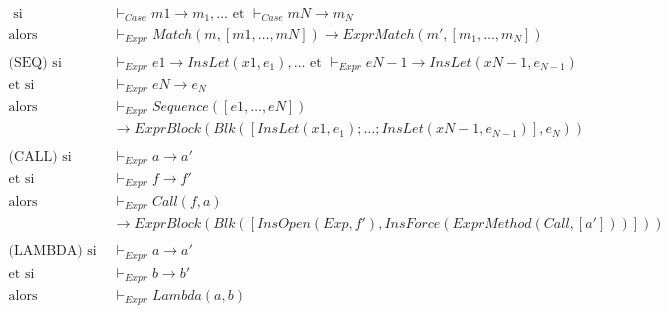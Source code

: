 \documentclass[
  12pt,
]{article}
\begin{document}
\begin{align*}
  \text{ si }                  & \vdash_{Case} m1 \rightarrow  m_1, \dots \text{ et } \vdash_{Case} mN \rightarrow  m_N                                  \\
  \text{alors}                 & \vdash_{Expr} Match(m,[m1,\dots,mN]) \rightarrow  ExprMatch(m', [m_1,\dots,m_N])                                        \\
  \\
  \text{(SEQ)} \text{ si }     & \vdash_{Expr} e1 \rightarrow  InsLet(x1, e_1), \dots \text{ et }  \vdash_{Expr} eN-1 \rightarrow  InsLet(xN-1, e_{N-1}) \\
  \text{et si }                & \vdash_{Expr} eN \rightarrow  e_N                                                                                       \\
  \text{alors}                 & \vdash_{Expr} Sequence([e1,\dots,eN])                                                                                   \\
                               & \rightarrow  ExprBlock(Blk([InsLet(x1, e_1); \dots ; InsLet(xN-1, e_{N-1})], e_N))                                      \\
  \\
  \text{(CALL)} \text{ si }    & \vdash_{Expr} a \rightarrow  a'                                                                                         \\
  \text{et si }                & \vdash_{Expr} f \rightarrow  f'                                                                                         \\
  \text{alors}                 & \vdash_{Expr} Call(f, a)                                                                                                \\
                               & \rightarrow  ExprBlock(Blk([InsOpen(Exp, f'), InsForce(ExprMethod(Call, [a']))]))                                       \\
  \\
  \text{(LAMBDA)} \text{ si }  & \vdash_{Expr} a \rightarrow  a'                                                                                         \\
  \text{et si }                & \vdash_{Expr} b \rightarrow  b'                                                                                         \\
  \text{alors}                 & \vdash_{Expr} Lambda(a, b)                                                                                              \\

\end{align*}
\end{document}
